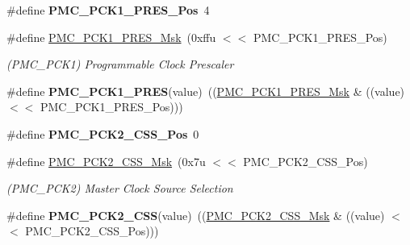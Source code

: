 \begin{DoxyCompactItemize}
\mbox{\label{group__SAMS70__PMC_gae05854559ce9fc45ab15509eee486026}} 
\#define {\bfseries P\+M\+C\+\_\+\+P\+C\+K1\+\_\+\+P\+R\+E\+S\+\_\+\+Pos}~4
\item 
\mbox{\label{group__SAMS70__PMC_gaca50064528f47995ca024ebaf4f026f7}} 
\#define \mbox{\hyperlink{group__SAMS70__PMC_gaca50064528f47995ca024ebaf4f026f7}{P\+M\+C\+\_\+\+P\+C\+K1\+\_\+\+P\+R\+E\+S\+\_\+\+Msk}}~(0xffu $<$$<$ P\+M\+C\+\_\+\+P\+C\+K1\+\_\+\+P\+R\+E\+S\+\_\+\+Pos)
\begin{DoxyCompactList}\small\item\em (P\+M\+C\+\_\+\+P\+C\+K1) Programmable Clock Prescaler \end{DoxyCompactList}\item 
\mbox{\label{group__SAMS70__PMC_ga6aa71f6e5abfa62fa6372c9ec70cef0d}} 
\#define {\bfseries P\+M\+C\+\_\+\+P\+C\+K1\+\_\+\+P\+R\+ES}(value)~((\mbox{\hyperlink{group__SAMS70__PMC_gaca50064528f47995ca024ebaf4f026f7}{P\+M\+C\+\_\+\+P\+C\+K1\+\_\+\+P\+R\+E\+S\+\_\+\+Msk}} \& ((value) $<$$<$ P\+M\+C\+\_\+\+P\+C\+K1\+\_\+\+P\+R\+E\+S\+\_\+\+Pos)))
\item 
\mbox{\label{group__SAMS70__PMC_ga34db0d6d81b357327dacd017fad3cb70}} 
\#define {\bfseries P\+M\+C\+\_\+\+P\+C\+K2\+\_\+\+C\+S\+S\+\_\+\+Pos}~0
\item 
\mbox{\label{group__SAMS70__PMC_ga0c8f5144a9174462d9402b98c0bc07cc}} 
\#define \mbox{\hyperlink{group__SAMS70__PMC_ga0c8f5144a9174462d9402b98c0bc07cc}{P\+M\+C\+\_\+\+P\+C\+K2\+\_\+\+C\+S\+S\+\_\+\+Msk}}~(0x7u $<$$<$ P\+M\+C\+\_\+\+P\+C\+K2\+\_\+\+C\+S\+S\+\_\+\+Pos)
\begin{DoxyCompactList}\small\item\em (P\+M\+C\+\_\+\+P\+C\+K2) Master Clock Source Selection \end{DoxyCompactList}\item 
\mbox{\label{group__SAMS70__PMC_ga2bc5ef28db20487996bb6a6d8197c4cd}} 
\#define {\bfseries P\+M\+C\+\_\+\+P\+C\+K2\+\_\+\+C\+SS}(value)~((\mbox{\hyperlink{group__SAMS70__PMC_ga0c8f5144a9174462d9402b98c0bc07cc}{P\+M\+C\+\_\+\+P\+C\+K2\+\_\+\+C\+S\+S\+\_\+\+Msk}} \& ((value) $<$$<$ P\+M\+C\+\_\+\+P\+C\+K2\+\_\+\+C\+S\+S\+\_\+\+Pos)))

\end{DoxyCompactItemize}
